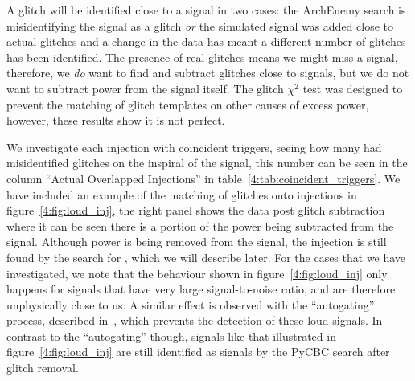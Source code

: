 A \scl{} glitch will be identified close to a \gw{} signal in two cases: the ArchEnemy search is misidentifying the \gw{} signal as a glitch \emph{or} the simulated signal was added close to actual glitches and a change in the data has meant a different number of glitches has been identified. The presence of real \scl{} glitches means we might miss a \gw{} signal, therefore, we \emph{do} want to find and subtract glitches close to \gw{} signals, but we do not want to subtract power from the \gw{} signal itself. The \scl{} glitch $\chi^{2}$ test was designed to prevent the matching of \scl{} glitch templates on other causes of excess power, however, these results show it is not perfect.

We investigate each injection with coincident \scl{} triggers, seeing how many had misidentified \scl{} glitches on the inspiral of the \gw{} signal, this number can be seen in the column ``Actual Overlapped Injections'' in table~\ref{4:tab:coincident_triggers}. We have included an example of the matching of \scl{} glitches onto \gw{} injections in figure~\ref{4:fig:loud_inj}, the right panel shows the \gw{} data post glitch subtraction where it can be seen there is a portion of the power being subtracted from the signal. Although power is being removed from the signal, the \gw{} injection is still found by the search for \gws{}, which we will describe later. For the cases that we have investigated, we note that the behaviour shown in figure~\ref{4:fig:loud_inj} only happens for signals that have very large signal-to-noise ratio, and are therefore unphysically close to us. A similar effect is observed with the ``autogating'' process, described in~\cite{PyCBC:2016}, which prevents the detection of these loud signals. In contrast to the ``autogating'' though, signals like that illustrated in figure~\ref{4:fig:loud_inj} are still identified as \gw{} signals by the PyCBC search after \scl{} glitch removal.

